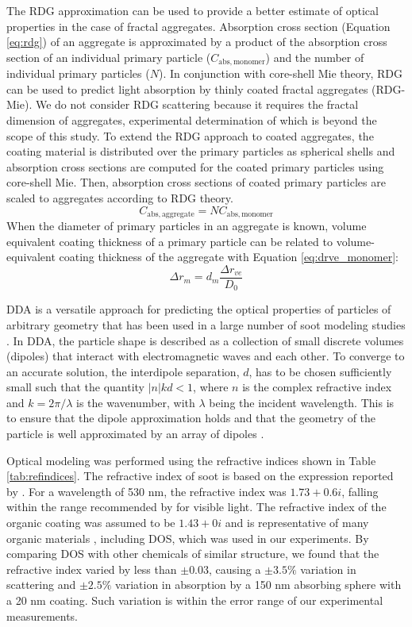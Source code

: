 The RDG approximation \citep{RN40,kerker2016scattering} can be used to provide a better estimate of optical properties in the case of fractal aggregates. Absorption cross section (Equation \ref{eq:rdg}) of an aggregate is approximated by a product of the absorption cross section of an individual primary particle ($C_\mathrm{abs,monomer}$) and the number of individual primary particles ($N$). In conjunction with core-shell Mie theory, RDG can be used to predict light absorption by thinly coated fractal aggregates (RDG-Mie). We do not consider RDG scattering because it requires the fractal dimension of aggregates, experimental determination of which is beyond the scope of this study. To extend the RDG approach to coated aggregates, the coating material is distributed over the primary particles as spherical shells and absorption cross sections are computed for the coated primary particles using core-shell Mie. Then, absorption cross sections of coated primary particles are scaled to aggregates according to RDG theory.
\begin{equation}
    C_\mathrm{abs,aggregate}=NC_\mathrm{abs,monomer}
    \label{eq:rdg}
\end{equation}
When the diameter of primary particles in an aggregate is known, volume equivalent coating thickness of a primary particle can be related to volume-equivalent coating thickness of the aggregate with Equation \ref{eq:drve_monomer}:
\begin{equation}
    \Delta r_{m}=d_m\frac{\Delta r_{ve}}{D_0}
    \label{eq:drve_monomer}
\end{equation}

DDA \citep{RN33} is a versatile approach for predicting the optical properties of particles of arbitrary geometry that has been used in a large number of soot modeling studies \citep{RN26,RN27,RN28}. In DDA, the particle shape is described as a collection of small discrete volumes (dipoles) that interact with electromagnetic waves and each other. To converge to an accurate solution, the interdipole separation, $d$, has to be chosen sufficiently small such that the quantity $|n|kd < 1$, where $n$ is the complex refractive index and $k = 2\pi/\lambda$ is the wavenumber, with $\lambda$ being the incident wavelength. This is to ensure that the dipole approximation holds \citep{RN29} and that the geometry of the particle is well approximated by an array of dipoles \citep{RN30}.

Optical modeling was performed using the refractive indices shown in Table \ref{tab:refindices}. The refractive index of soot is based on the expression reported by \citet{RN23}. For a wavelength of 530 nm, the refractive index was $1.73+0.6i$, falling within the range recommended by \citet{RN34} for visible light. The refractive index of the organic coating was assumed to be $1.43+0i$ and is representative of many organic materials \citep{crchandbook}, including DOS, which was used in our experiments. By comparing DOS with other chemicals of similar structure, we found that the refractive index varied by less than  $\pm0.03$, causing a $\pm 3.5\%$ variation in scattering and $\pm 2.5\%$ variation in absorption by a 150 nm absorbing sphere with a 20 nm coating. Such variation is within the error range of our experimental measurements.

